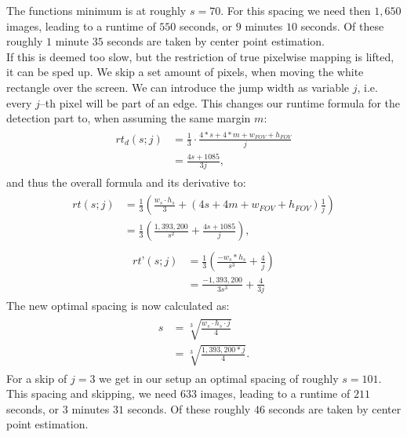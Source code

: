 \documentclass[journal,final,a4paper,twoside]{PS}
\begin{document}
The functions minimum is at roughly $s = 70$. For this spacing we need then $1,650$ images, leading to a runtime of $550$ seconds, or $9$ minutes $10$ seconds. Of these roughly $1$ minute $35$ seconds are taken by center point estimation.\\
If this is deemed too slow, but the restriction of true pixelwise mapping is lifted, it can be sped up. We skip a set amount of pixels, when moving the white rectangle over the screen. We can introduce the jump width as variable $j$, i.e. every $j$--th pixel will be part of an edge. This changes our runtime formula for the detection part to, when assuming the same margin $m$:
\begin{align}\begin{split}
rt_d (s; j) &=\frac{1}{3} \cdot \frac{4*s + 4 * m + w_{FOV} + h_{FOV}}{j}\\
 &= \frac{4s + 1085}{3j},\end{split}
\end{align}
and thus the overall formula and its derivative to:
\begin{align}\begin{split}
rt(s; j) &= \frac{1}{3} \left(\frac{w_s\cdot h_s}{3} + \left( 4s + 4m + w_{FOV} + h_{FOV}\right)\frac{1}{j}\right)\\ &=\frac{1}{3}\left( \frac{1,393,200}{s^2} + \frac{4s +1085}{j}\right),\end{split}
\end{align}
\begin{align}\begin{split}
rt’(s; j) &= \frac{1}{3} \left(\frac{-w_s * h_s}{s^3} + \frac{4}{j}\right)\\& =\frac{-1,393,200 }{3s^3} + \frac{4}{3j} \end{split}
\end{align}
The new optimal spacing is now calculated as:
\begin{align}\begin{split}
s &= \sqrt[3]{\frac{w_s \cdot h_s \cdot j }{ 4}} \\&= \sqrt[3]{\frac{1,393,200 * j} { 4}}.\end{split}
\end{align}
For a skip of $j = 3$ we get in our setup an optimal spacing of roughly $s = 101$. This spacing and skipping, we need $633$ images, leading to a runtime of $211$ seconds, or $3$ minutes $31$ seconds. Of these roughly $46$ seconds are taken by center point estimation.
\end{document}

